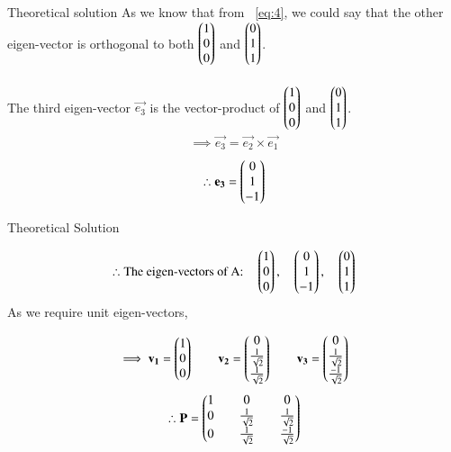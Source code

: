 \documentclass{beamer}
\begin{document}
\begin{frame}{Theoretical solution}
    As we know that from ~\eqref{eq:4}, we could say that the other eigen-vector is orthogonal to both $\begin{pmatrix}1\\0\\0\end{pmatrix}$ and $\begin{pmatrix}0\\1\\1\end{pmatrix}$.\\
\\
The third eigen-vector $\vec{e_3}$ is the vector-product of $\begin{pmatrix}1\\0\\0\end{pmatrix}$ and $\begin{pmatrix}0\\1\\1\end{pmatrix}$.
\begin{align}
    \implies \vec{e_3}=\vec{e_2} \times \vec{e_1}
\end{align}
\begin{align}
    \therefore \mathbf{e_3}=\begin{pmatrix}0\\1\\-1\end{pmatrix}
\end{align}
\end{frame}

\begin{frame}{Theoretical Solution}

\begin{align}
    \therefore \text{The eigen-vectors of A:}\quad \begin{pmatrix}1\\0\\0\end{pmatrix},\quad \begin{pmatrix}0\\1\\-1\end{pmatrix},\quad \begin{pmatrix}0\\1\\1\end{pmatrix}
\end{align}
As we require unit eigen-vectors,

\begin{align}
    \implies \mathbf{v_1}=\begin{pmatrix}1\\0\\0\end{pmatrix} \qquad \mathbf{v_2}=\begin{pmatrix}0\\\frac{1}{\sqrt{2}}\\\frac{1}{\sqrt{2}}\end{pmatrix} \qquad \mathbf{v_3}=\begin{pmatrix}0\\\frac{1}{\sqrt{2}}\\\frac{-1}{\sqrt{2}}\end{pmatrix}
\end{align}
\begin{align}
    \therefore \mathbf{P}=\begin{pmatrix}1&&0&&0\\0&&\frac{1}{\sqrt{2}}&&\frac{1}{\sqrt{2}}\\0&&\frac{1}{\sqrt{2}}&&\frac{-1}{\sqrt{2}}\end{pmatrix}
\end{align}
\end{frame}
\end{document}

